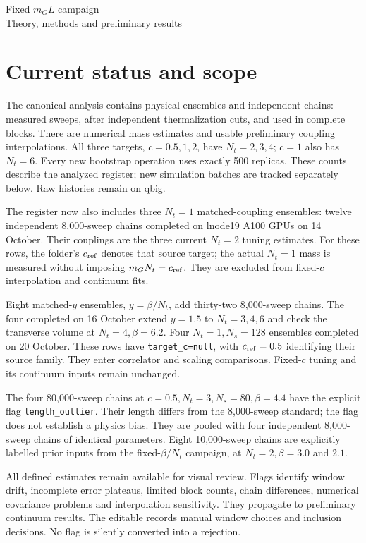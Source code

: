 \documentclass[11pt,a4paper]{article}
\begin{document}
\begin{center}{\LARGE Fixed $m_G L$ campaign}\\[6pt]{\large Theory, methods and preliminary results}\end{center}

\section*{Current status and scope}
The canonical analysis contains \Ensembles{} physical ensembles and \Chains{}
independent chains: \TotalSweeps{} measured sweeps, \RetainedSweeps{} after
independent thermalization cuts, and \UsedSweeps{} used in complete blocks.
There are \NumericalMasses{} numerical mass estimates and \TuningPoints{}
usable preliminary coupling interpolations. All three targets, $c=0.5,1,2$,
have $N_t=2,3,4$; $c=1$ also has $N_t=6$. Every new bootstrap operation uses
exactly 500 replicas. These counts describe the analyzed register; new
simulation batches are tracked separately below. Raw histories remain on qbig.

The register now also includes three $N_t=1$ matched-coupling ensembles:
twelve independent 8,000-sweep chains completed on lnode19 A100 GPUs on
14 October. Their couplings are the three current $N_t=2$ tuning estimates.
For these rows, the folder's $c_{\rm ref}$ denotes that source target;
the actual $N_t=1$ mass is measured without imposing $m_GN_t=c_{\rm ref}$.
They are excluded from fixed-$c$ interpolation and continuum fits.

Eight matched-$y$ ensembles, $y=\beta/N_t$, add thirty-two 8,000-sweep chains.
The four completed on 16 October extend $y=1.5$ to $N_t=3,4,6$ and check
the transverse volume at $N_t=4,\beta=6.2$. Four $N_t=1,N_s=128$ ensembles
completed on 20 October. These rows have \texttt{target\_c=null}, with
$c_{\rm ref}=0.5$ identifying their source family. They enter correlator
and scaling comparisons. Fixed-$c$ tuning and its continuum inputs remain
unchanged.

The four 80,000-sweep chains at $c=0.5,N_t=3,N_s=80,\beta=4.4$ have the
explicit flag \texttt{length\_outlier}. Their length differs from the
8,000-sweep standard; the flag does not establish a physics bias. They are
pooled with four independent 8,000-sweep chains of identical parameters.
Eight 10,000-sweep chains are explicitly labelled prior inputs from the
fixed-$\beta/N_t$ campaign, at $N_t=2,\beta=3.0$ and $2.1$.

All defined estimates remain available for visual review. Flags identify
window drift, incomplete error plateaus, limited block counts, chain
differences, numerical covariance problems and interpolation sensitivity.
They propagate to preliminary continuum results. The editable
 records manual window choices and
inclusion decisions. No flag is silently converted into a rejection.
\end{document}
